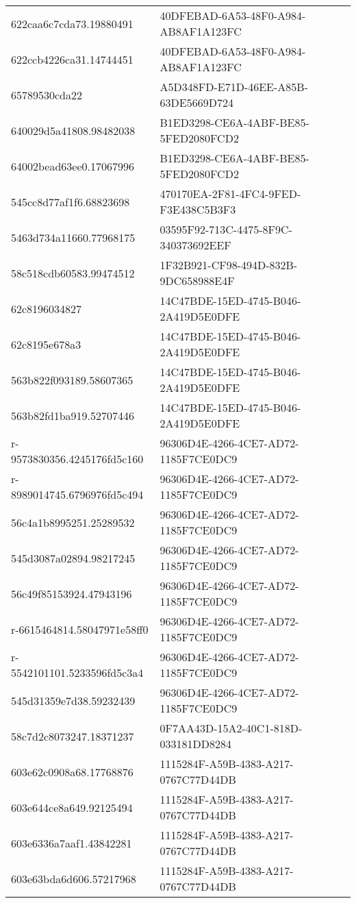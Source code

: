 \begin{tabular}{ll}
622caa6c7cda73.19880491 & 40DFEBAD-6A53-48F0-A984-AB8AF1A123FC \\
622ccb4226ca31.14744451 & 40DFEBAD-6A53-48F0-A984-AB8AF1A123FC \\
65789530cda22 & A5D348FD-E71D-46EE-A85B-63DE5669D724 \\
640029d5a41808.98482038 & B1ED3298-CE6A-4ABF-BE85-5FED2080FCD2 \\
64002bead63ee0.17067996 & B1ED3298-CE6A-4ABF-BE85-5FED2080FCD2 \\
545cc8d77af1f6.68823698 & 470170EA-2F81-4FC4-9FED-F3E438C5B3F3 \\
5463d734a11660.77968175 & 03595F92-713C-4475-8F9C-340373692EEF \\
58c518cdb60583.99474512 & 1F32B921-CF98-494D-832B-9DC658988E4F \\
62c8196034827 & 14C47BDE-15ED-4745-B046-2A419D5E0DFE \\
62c8195e678a3 & 14C47BDE-15ED-4745-B046-2A419D5E0DFE \\
563b822f093189.58607365 & 14C47BDE-15ED-4745-B046-2A419D5E0DFE \\
563b82fd1ba919.52707446 & 14C47BDE-15ED-4745-B046-2A419D5E0DFE \\
r-9573830356.4245176fd5c160 & 96306D4E-4266-4CE7-AD72-1185F7CE0DC9 \\
r-8989014745.6796976fd5c494 & 96306D4E-4266-4CE7-AD72-1185F7CE0DC9 \\
56c4a1b8995251.25289532 & 96306D4E-4266-4CE7-AD72-1185F7CE0DC9 \\
545d3087a02894.98217245 & 96306D4E-4266-4CE7-AD72-1185F7CE0DC9 \\
56c49f85153924.47943196 & 96306D4E-4266-4CE7-AD72-1185F7CE0DC9 \\
r-6615464814.58047971e58ff0 & 96306D4E-4266-4CE7-AD72-1185F7CE0DC9 \\
r-5542101101.5233596fd5c3a4 & 96306D4E-4266-4CE7-AD72-1185F7CE0DC9 \\
545d31359e7d38.59232439 & 96306D4E-4266-4CE7-AD72-1185F7CE0DC9 \\
58c7d2c8073247.18371237 & 0F7AA43D-15A2-40C1-818D-033181DD8284 \\
603e62c0908a68.17768876 & 1115284F-A59B-4383-A217-0767C77D44DB \\
603e644ce8a649.92125494 & 1115284F-A59B-4383-A217-0767C77D44DB \\
603e6336a7aaf1.43842281 & 1115284F-A59B-4383-A217-0767C77D44DB \\
603e63bda6d606.57217968 & 1115284F-A59B-4383-A217-0767C77D44DB \\

\end{tabular}

